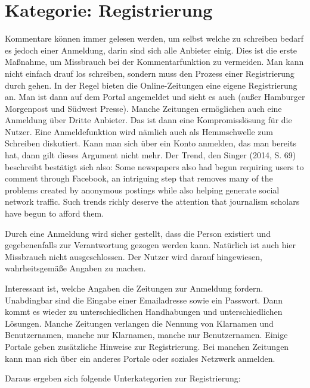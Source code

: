 

\section{Kategorie: \glqq Registrierung\grqq}

Kommentare können immer gelesen werden, um selbst welche zu schreiben bedarf es
jedoch einer Anmeldung, darin sind sich alle Anbieter einig. Dies ist die erste
Maßnahme, um Missbrauch bei der Kommentarfunktion zu vermeiden. Man kann nicht
einfach drauf los schreiben, sondern muss den Prozess einer Registrierung durch
gehen. In der Regel bieten die Online-Zeitungen eine eigene Registrierung an.
Man ist dann auf dem Portal angemeldet und sieht es auch (außer Hamburger
Morgenpost und Südwest Presse). Manche Zeitungen ermöglichen auch eine Anmeldung
über Dritte Anbieter. Das ist dann eine Kompromisslösung für die Nutzer. Eine
Anmeldefunktion wird nämlich auch als Hemmschwelle zum Schreiben diskutiert.
Kann man sich über ein Konto anmelden, das man bereits hat, dann gilt dieses
Argument nicht mehr. Der Trend, den Singer (2014, S. 69)
beschreibt bestätigt sich also: \glqq Some newspapers also had begun requiring users to
comment through Facebook, an intriguing step that removes many of the problems
created by anonymous postings while also helping generate social network
traffic. Such trends richly deserve the attention that journalism scholars have
begun to afford them.\grqq

Durch eine Anmeldung wird sicher gestellt, dass die Person existiert und 
gegebenenfalls zur Verantwortung gezogen werden kann.
Natürlich ist auch hier Missbrauch nicht ausgeschlossen. Der Nutzer wird darauf hingewiesen,
wahrheitsgemäße Angaben zu machen. 

Interessant ist, welche Angaben die Zeitungen zur Anmeldung fordern. Unabdingbar
sind die Eingabe einer Emailadresse sowie ein Passwort. Dann kommt es wieder zu
unterschiedlichen Handhabungen und unterschiedlichen Lösungen. Manche Zeitungen
verlangen die Nennung von Klarnamen und Benutzernamen, manche nur Klarnamen,
manche nur Benutzernamen. Einige Portale geben zusätzliche Hinweise zur
Registrierung. Bei manchen Zeitungen kann man sich über ein anderes Portale oder 
soziales Netzwerk anmelden.

Daraus ergeben sich folgende Unterkategorien zur Registrierung:

